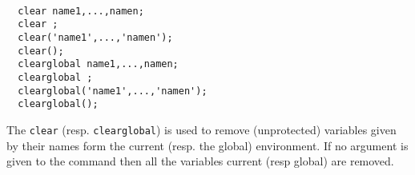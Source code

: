 

\begin{mandesc}
   \\
\end{mandesc}
\label{clear}
\label{clearglobal}
\begin{calling_sequence}
\begin{verbatim}
  clear name1,...,namen;
  clear ;
  clear('name1',...,'namen');
  clear();
  clearglobal name1,...,namen;
  clearglobal ;
  clearglobal('name1',...,'namen');
  clearglobal();
\end{verbatim}

\end{calling_sequence}

\begin{mandescription}
  The \verb+clear+ (resp. \verb+clearglobal+) is used to remove (unprotected) variables given by their names 
  form the current (resp. the global) environment. If no argument is given to the command then all the 
  variables current (resp global) are removed. 
\end{mandescription}
\begin{manseealso}
\end{manseealso}

